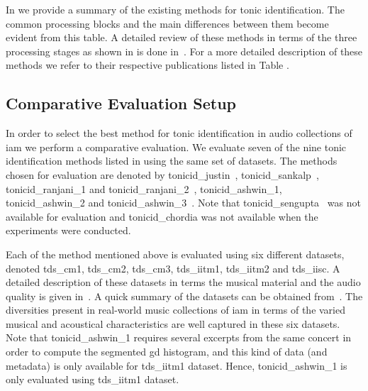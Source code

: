 {In  we provide a summary of the existing methods for tonic identification. The common processing blocks and the main differences between them become evident from this table. A detailed review of these methods in terms of the three processing stages as shown in  is done in~\cite{Gulati2014Tonic}. For a more detailed description of these methods we refer to their respective publications listed in Table . 


\subsection{Comparative Evaluation Setup}
\label{sec:pre_processing_experimental_setup}

In order to select the best method for tonic identification in audio collections of \gls{iam} we perform a comparative evaluation. We evaluate seven of the nine tonic identification methods listed in  using the same set of datasets. The methods chosen for evaluation are
denoted by \acrshort{tonicid_justin}~\citep{salamon2012multipitch}, \acrshort{tonicid_sankalp}~\citep{gulati2012two}, \acrshort{tonicid_ranjani_1} and \acrshort{tonicid_ranjani_2}~\citep{ranjani2011carnatic}, \acrshort{tonicid_ashwin_1}, \acrshort{tonicid_ashwin_2} and \acrshort{tonicid_ashwin_3}~\citep{bellur2012knowledge}. Note that \acrshort{tonicid_sengupta}~\citep{Sengupta2005b} was not available for
evaluation and \acrshort{tonicid_chordia} was not available when the experiments were conducted. 

Each of the method mentioned above is evaluated using six different datasets, denoted \acrshort{tds_cm1}, \acrshort{tds_cm2}, \acrshort{tds_cm3}, \acrshort{tds_iitm1}, \acrshort{tds_iitm2} and \acrshort{tds_iisc}. A detailed description of these datasets in terms the musical material and the audio quality is given in~. A quick summary of the datasets can be obtained from~. The diversities present in real-world music collections of \gls{iam} in terms of the varied musical and acoustical characteristics are well captured in these six datasets. Note that \acrshort{tonicid_ashwin_1} requires several excerpts from the same concert in order to compute the segmented \gls{gd} histogram, and this kind of data (and metadata) is only available for \acrshort{tds_iitm1} dataset. Hence, \acrshort{tonicid_ashwin_1} is only evaluated using \acrshort{tds_iitm1} dataset.

}
